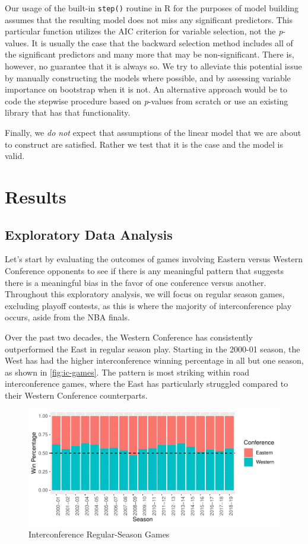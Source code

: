 \documentclass[
    12pt,
    a4paper,
    titlepage,  %
    abstract,  %
    headings=standardclasses,  %
    bibliography=totocnumbered  %
]{scrartcl}
\begin{document}
Our usage of the built-in \texttt{step()} routine in R for the purposes of model building assumes that the resulting model does not miss any significant predictors. This particular function utilizes the AIC criterion for variable selection, not the \emph{p}-values. It is usually the case that the backward selection method includes all of the significant predictors and many more that may be non-significant. There is, however, no guarantee that it is always so. We try to alleviate this potential issue by manually constructing the models where possible, and by assessing variable importance on bootstrap when it is not. An alternative approach would be to code the stepwise procedure based on \emph{p}-values from scratch or use an existing library that has that functionality.

Finally, we \emph{do not} expect that assumptions of the linear model that we are about to construct are satisfied. Rather we test that it is the case and the model is valid.

\section{Results}

\subsection{Exploratory Data Analysis}

Let's start by evaluating the outcomes of games involving Eastern versus Western Conference opponents to see if there is any meaningful pattern that suggests there is a meaningful bias in the favor of one conference versus another. Throughout this exploratory analysis, we will focus on regular season games, excluding playoff contests, as this is where the majority of interconference play occurs, aside from the NBA finals.

Over the past two decades, the Western Conference has consistently outperformed the East in regular season play. Starting in the 2000-01 season, the West has had the higher interconference winning percentage in all but one season, as shown in \autoref{fig:ic-games}. The pattern is most striking within road interconference games, where the East has particularly struggled compared to their Western Conference counterparts.

\begin{figure}[ht]
    \centering
    \includegraphics[width=\linewidth]{ic-games}
    \caption{Interconference Regular-Season Games}
    \label{fig:ic-games}
\end{figure}
\end{document}
